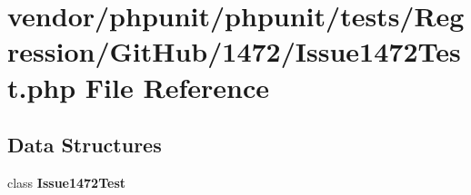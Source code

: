 \section{vendor/phpunit/phpunit/tests/\+Regression/\+Git\+Hub/1472/\+Issue1472\+Test.php File Reference}
\label{_issue1472_test_8php}
\subsection*{Data Structures}
\begin{DoxyCompactItemize}
\item 
class {\bf Issue1472\+Test}
\end{DoxyCompactItemize}
